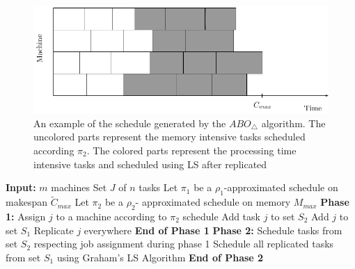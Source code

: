    \begin{figure}[htp]
   \centering
   \includegraphics[width= 16 cm]{mem.pdf}
   \caption{An example of the schedule generated by the $ABO_\triangle$ algorithm. The uncolored parts represent the memory intensive tasks scheduled according $\pi_2$. The colored parts represent the processing time intensive tasks and scheduled using LS after replicated}
   \label{fig:ch5-2}
   \end{figure}
  \begin{algorithm}
  
  \caption{$ABO_\triangle$}
  \label{alg1}
   \begin{algorithmic} 
   \State \textbf{Input:} $m$ machines 
   \State \hspace*{42pt}Set $J$ of $n$ tasks
   \State\hspace*{42pt}Let $\pi_1$ be a $ \rho_1$-approximated schedule on makespan $\tilde{C}_{max}$ 
  \State \hspace*{42pt}Let $\pi_2$ be a $\rho_2$- approximated schedule on memory ${M_{max}}$
  \State
   \State \textbf{Phase 1:}
\State Assign $j$ to a machine according to $\pi_2$ schedule
\State Add task $j$ to set $S_2$   
\EndIf 
\EndFor
{}
\State Add $j$ to set $S_1$
\State Replicate $j$ everywhere   
\EndIf 
\EndFor
 \State \textbf{End of Phase 1} 
 \State 
  \State \textbf{Phase 2:} 
  \State \hspace*{42pt}Schedule tasks from set $S_2$ respecting job assignment during phase 1
     \State \hspace*{42pt} Schedule all replicated tasks from set $S_1$ using Graham's LS Algorithm 
  \State \textbf{End of Phase 2} 
   
        \end{algorithmic}
        \end{algorithm}
      
